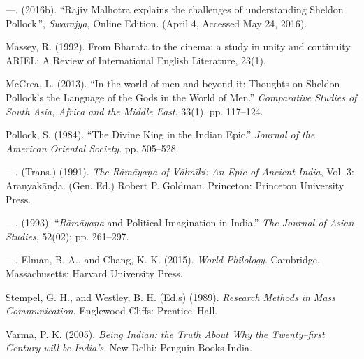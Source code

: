 \begin{thebibliography}{99}
  —. (2016b). “Rajiv Malhotra explains the challenges of understanding Sheldon Pollock.”, \textit{Swarajya}, Online Edition. (April 4, Accessed May 24, 2016).

  Massey, R. (1992). From Bharata to the cinema: a study in unity and continuity. ARIEL: A Review of International English Literature, 23(1).

  McCrea, L. (2013). “In the world of men and beyond it: Thoughts on Sheldon Pollock’s the Language of the Gods in the World of Men.” \textit{Comparative Studies of South Asia, Africa and the Middle East}, 33(1). pp. 117–124.

  Pollock, S. (1984). “The Divine King in the Indian Epic.” \textit{Journal of the American Oriental Society}. pp. 505–528.

  —. (Trans.) (1991). \textit{The Rāmāyaṇa of Vālmīki: An Epic of Ancient India}, Vol. 3: Araṇyakāṇḍa. (Gen. Ed.) Robert P. Goldman. Princeton: Princeton University Press.

  —. (1993). “\textit{Rāmāyaṇa} and Political Imagination in India.” \textit{The Journal of Asian Studies}, 52(02); pp. 261–297.

  —. Elman, B. A., and Chang, K. K. (2015). \textit{World Philology}. Cambridge, Massachusetts: Harvard University Press.

  Stempel, G. H., and Westley, B. H. (Ed.s) (1989). \textit{Research Methods in Mass Communication}. Englewood Cliffs: Prentice–Hall.

  Varma, P. K. (2005). \textit{Being Indian: the Truth About Why the Twenty–first Century will be India's}. New Delhi: Penguin Books India.

 \end{thebibliography}

